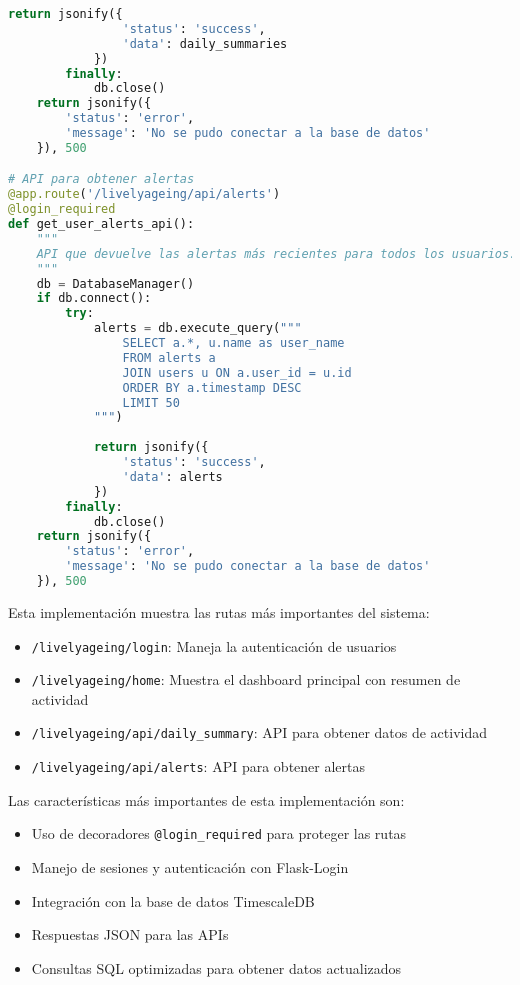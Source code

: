 \begin{lstlisting}[language=Python, caption=Implementación de rutas principales en Flask]
            return jsonify({
                'status': 'success',
                'data': daily_summaries
            })
        finally:
            db.close()
    return jsonify({
        'status': 'error',
        'message': 'No se pudo conectar a la base de datos'
    }), 500

# API para obtener alertas
@app.route('/livelyageing/api/alerts')
@login_required
def get_user_alerts_api():
    """
    API que devuelve las alertas más recientes para todos los usuarios.
    """
    db = DatabaseManager()
    if db.connect():
        try:
            alerts = db.execute_query("""
                SELECT a.*, u.name as user_name
                FROM alerts a
                JOIN users u ON a.user_id = u.id
                ORDER BY a.timestamp DESC
                LIMIT 50
            """)
            
            return jsonify({
                'status': 'success',
                'data': alerts
            })
        finally:
            db.close()
    return jsonify({
        'status': 'error',
        'message': 'No se pudo conectar a la base de datos'
    }), 500
\end{lstlisting}

Esta implementación muestra las rutas más importantes del sistema:

\begin{itemize}
    \item \texttt{/livelyageing/login}: Maneja la autenticación de usuarios
    \item \texttt{/livelyageing/home}: Muestra el dashboard principal con resumen de actividad
    \item \texttt{/livelyageing/api/daily\_summary}: API para obtener datos de actividad
    \item \texttt{/livelyageing/api/alerts}: API para obtener alertas
\end{itemize}

Las características más importantes de esta implementación son:

\begin{itemize}
    \item Uso de decoradores \texttt{@login\_required} para proteger las rutas
    \item Manejo de sesiones y autenticación con Flask-Login
    \item Integración con la base de datos TimescaleDB
    \item Respuestas JSON para las APIs
    \item Consultas SQL optimizadas para obtener datos actualizados
\end{itemize}

